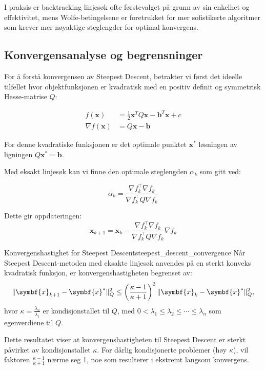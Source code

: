 I praksis er backtracking linjesøk ofte førstevalget på grunn av sin enkelhet og effektivitet, mens Wolfe-betingelsene er foretrukket for mer sofistikerte algoritmer som krever mer nøyaktige steglengder for optimal konvergens.

\subsection{Konvergensanalyse og begrensninger}
\label{subsec:steepest_descent_convergence}

For å forstå konvergensen av Steepest Descent, betrakter vi først det ideelle tilfellet hvor objektfunksjonen er kvadratisk med en positiv definit og symmetrisk Hesse-matrise \(Q\):

\begin{align*}
	f(\symbf{x})        & = \frac{1}{2} \symbf{x}^T Q \symbf{x} - \symbf{b}^T \symbf{x} + c \\
	\nabla f(\symbf{x}) & = Q \symbf{x} - \symbf{b}
\end{align*}

For denne kvadratiske funksjonen er det optimale punktet \(\symbf{x}^\ast\) løsningen av ligningen \(Q \symbf{x}^\ast = \symbf{b}\).

Med eksakt linjesøk kan vi finne den optimale steglengden \(\alpha_k\) som gitt ved:

\[
	\alpha_k = \frac{\nabla f_k^\top \nabla f_k}{\nabla f_k^\top Q \nabla f_k}
\]

Dette gir oppdateringen:
\begin{equation}
	\symbf{x}_{k+1} = \symbf{x}_k - \frac{\nabla f_k^\top \nabla f_k}{\nabla f_k^\top Q \nabla f_k} \nabla f_k
\end{equation}

\begin{theorem}{Konvergenshastighet for Steepest Descent}{steepest_descent_convergence}
	Når Steepest Descent-metoden med eksakte linjesøk anvendes på en sterkt konveks kvadratisk funksjon, er konvergenshastigheten begrenset av:
	\[
		\norm{\symbf{x}_{k+1} - \symbf{x}^\ast}_Q^2 \leq \left(\frac{\kappa - 1}{\kappa + 1}\right)^2 \norm{\symbf{x}_k - \symbf{x}^\ast}_Q^2,
	\]
	hvor \( \kappa = \frac{\lambda_n}{\lambda_1} \) er kondisjonstallet til \( Q \), med \( 0 < \lambda_1 \leq \lambda_2 \leq \cdots \leq \lambda_n \) som egenverdiene til \( Q \).
\end{theorem}

Dette resultatet viser at konvergenshastigheten til Steepest Descent er sterkt påvirket av kondisjonstallet \( \kappa \). For dårlig kondisjonerte problemer (høy \(\kappa\)), vil faktoren \( \frac{\kappa - 1}{\kappa + 1} \) nærme seg 1, noe som resulterer i ekstremt langsom konvergens.

